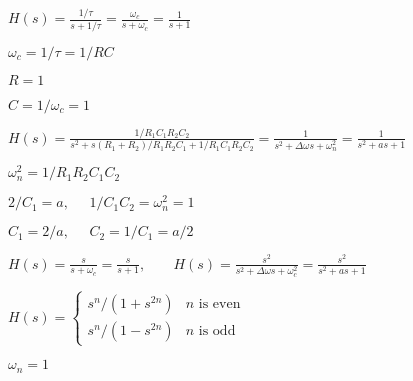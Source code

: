 \documentclass{article}
\def\lthtmlcheckvsize{\ifdim\ht\sizebox<\vsize 
  \ifdim\wd\sizebox<\hsize\expandafter\hfill\fi \expandafter\vfill
  \else\expandafter\vss\fi}%
\begin{document}
{\newpage\clearpage
{}%
$\displaystyle H(s)=\frac{1/\tau}{s+1/\tau}=\frac{\omega_c}{s+\omega_c}=\frac{1}{s+1}
  $%
\lthtmlindisplaymathZ
\lthtmlcheckvsize\clearpage}

{\newpage\clearpage
{}%
$\omega_c=1/\tau=1/RC$%
\lthtmlindisplaymathZ
\lthtmlcheckvsize\clearpage}

{\newpage\clearpage
{}%
$R=1$%
\lthtmlindisplaymathZ
\lthtmlcheckvsize\clearpage}

{\newpage\clearpage
{}%
$C=1/\omega_c=1$%
\lthtmlindisplaymathZ
\lthtmlcheckvsize\clearpage}

{\newpage\clearpage
{}%
$\displaystyle H(s)=\frac{1/R_1C_1R_2C_2}{s^2+s(R_1+R_2)/R_1R_2C_1+1/R_1C_1R_2C_2}
  =\frac{1}{s^2+\Delta\omega s+\omega_n^2}=\frac{1}{s^2+a s+1}
  $%
\lthtmlindisplaymathZ
\lthtmlcheckvsize\clearpage}

{\newpage\clearpage
{}%
$\omega_n^2=1/R_1R_2C_1C_2$%
\lthtmlindisplaymathZ
\lthtmlcheckvsize\clearpage}

{\newpage\clearpage
{}%
$\displaystyle 2/C_1=a,\;\;\;\;\;1/C_1C_2=\omega_n^2=1
  $%
\lthtmlindisplaymathZ
\lthtmlcheckvsize\clearpage}

{\newpage\clearpage
{}%
$\displaystyle C_1=2/a,\;\;\;\;\; C_2=1/C_1=a/2
  $%
\lthtmlindisplaymathZ
\lthtmlcheckvsize\clearpage}

{\newpage\clearpage
{}%
$\displaystyle H(s)=\frac{s}{s+\omega_c}=\frac{s}{s+1},\;\;\;\;\;\;\;
  H(s)=\frac{s^2}{s^2+\Delta\omega s+\omega_c^2}=\frac{s^2}{s^2+a s+1}
  $%
\lthtmlindisplaymathZ
\lthtmlcheckvsize\clearpage}

{\newpage\clearpage
{}%
$\displaystyle H(s)=\left\{\begin{array}{cc}s^n/(1+s^{2n}) & \mbox{$n$\  is even}\\
  s^n/(1-s^{2n}) & \mbox{$n$\  is odd}\end{array}\right.
  $%
\lthtmlindisplaymathZ
\lthtmlcheckvsize\clearpage}

{\newpage\clearpage
{}%
$\omega_n=1$%
\lthtmlindisplaymathZ
\lthtmlcheckvsize\clearpage}
\end{document}
